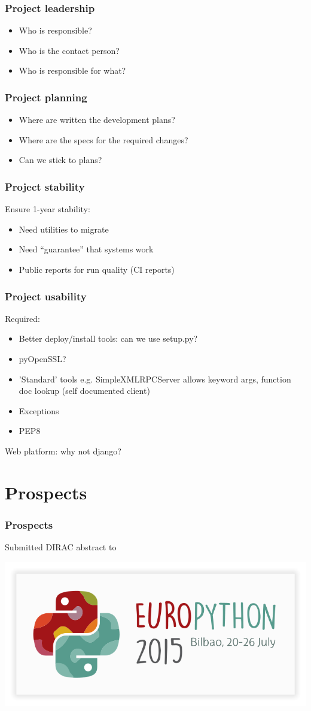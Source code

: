 \documentclass[14pt]{beamer}
\begin{document}
\begin{frame}
\frametitle{Project leadership}
\begin{itemize}
\item Who is responsible?
\item Who is the contact person?
\item Who is responsible for what?
\end{itemize}
\end{frame}

\begin{frame}
\frametitle{Project planning}
\begin{itemize}
\item Where are written the development plans?
\item Where are the specs for the required changes?
\item Can we stick to plans?
\end{itemize}
\end{frame}

\begin{frame}
\frametitle{Project stability}
Ensure 1-year stability:
\begin{itemize}
\item Need utilities to migrate
\item Need ``guarantee'' that systems work
\item Public reports for run quality (CI reports)
\end{itemize}
\end{frame}

\begin{frame}
\frametitle{Project usability}
Required:
\begin{itemize}
\item Better deploy/install tools: can we use setup.py?
\item pyOpenSSL?
\item 'Standard' tools e.g. SimpleXMLRPCServer allows keyword args, function doc lookup (self documented client)
\item Exceptions
\item PEP8
\end{itemize}
Web platform: why not django?
\end{frame}

\section{Prospects}
\begin{frame}
\frametitle{Prospects}
Submitted DIRAC abstract to

\centering
\includegraphics[width=\textwidth]{europython-2015-logo-white-bg.png}
\end{frame}
\end{document}
